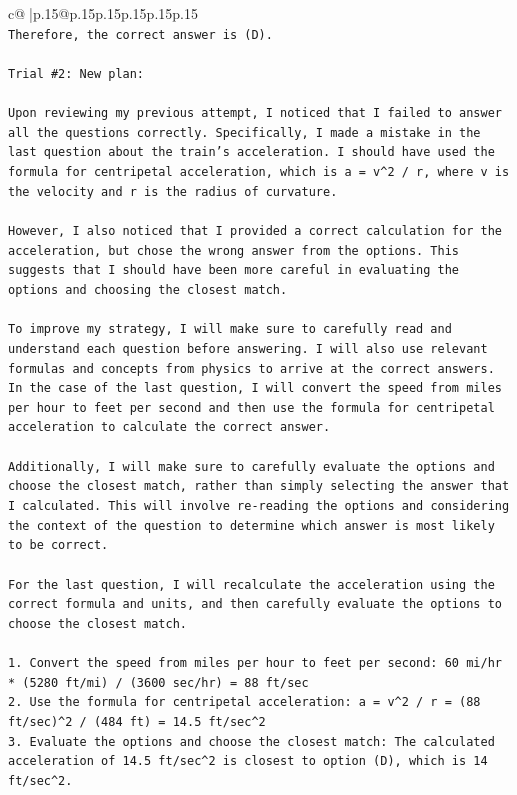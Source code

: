 \documentclass{article}
\begin{document}
{\begin{supertabular}{c@{$\;$}|p{.15\linewidth}@{}p{.15\linewidth}p{.15\linewidth}p{.15\linewidth}p{.15\linewidth}p{.15\linewidth}}
{{{\\ 
\texttt{Therefore, the correct answer is (D).} \\
\\ 
\texttt{Trial \#2: New plan: } \\
\\ 
\texttt{Upon reviewing my previous attempt, I noticed that I failed to answer all the questions correctly. Specifically, I made a mistake in the last question about the train's acceleration. I should have used the formula for centripetal acceleration, which is a = v\^{}2 / r, where v is the velocity and r is the radius of curvature. } \\
\\ 
\texttt{However, I also noticed that I provided a correct calculation for the acceleration, but chose the wrong answer from the options. This suggests that I should have been more careful in evaluating the options and choosing the closest match.} \\
\\ 
\texttt{To improve my strategy, I will make sure to carefully read and understand each question before answering. I will also use relevant formulas and concepts from physics to arrive at the correct answers. In the case of the last question, I will convert the speed from miles per hour to feet per second and then use the formula for centripetal acceleration to calculate the correct answer.} \\
\\ 
\texttt{Additionally, I will make sure to carefully evaluate the options and choose the closest match, rather than simply selecting the answer that I calculated. This will involve re{-}reading the options and considering the context of the question to determine which answer is most likely to be correct.} \\
\\ 
\texttt{For the last question, I will recalculate the acceleration using the correct formula and units, and then carefully evaluate the options to choose the closest match.} \\
\\ 
\texttt{1. Convert the speed from miles per hour to feet per second: 60 mi/hr * (5280 ft/mi) / (3600 sec/hr) = 88 ft/sec} \\
\texttt{2. Use the formula for centripetal acceleration: a = v\^{}2 / r = (88 ft/sec)\^{}2 / (484 ft) = 14.5 ft/sec\^{}2} \\
\texttt{3. Evaluate the options and choose the closest match: The calculated acceleration of 14.5 ft/sec\^{}2 is closest to option (D), which is 14 ft/sec\^{}2.} \\
}}}
\end{supertabular}}
\end{document}
